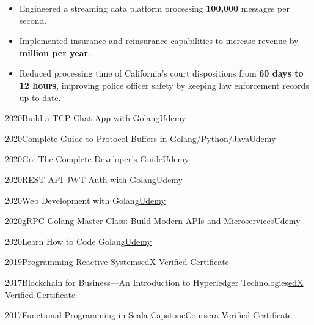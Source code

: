 \documentclass[a4paper,12pt]{article}
\newcommand{\head}[1]{\needspace{6em}\begin{center}{\large{\textbf{\sc{#1}}}}\nopagebreak\end{center}}
\newcommand{\tab}{\hspace{2em}}
\newcommand{\education}[3]{#1\tab#2\hfill#3}
\begin{document}
\head{Achievements}

\begin{itemize}

\item Engineered a streaming data platform processing \textbf{100,000} messages per second.

\item Implemented insurance and reinsurance capabilities to increase revenue by \textbf{ million per year}.

\item Reduced processing time of California's court dispositions from \textbf{60 days to 12 hours}, improving police officer safety by keeping law enforcement records up to date.

\end{itemize}

\head{Certifications}

\education{2020}{Build a TCP Chat App with Golang}{\href{https://www.udemy.com/certificate/UC-INP6UTFA}{Udemy}}

\education{2020}{Complete Guide to Protocol Buffers in Golang/Python/Java}{\href{https://www.udemy.com/certificate/UC-Q1168M4T}{Udemy}}

\education{2020}{Go: The Complete Developer's Guide}{\href{https://www.udemy.com/certificate/UC-2DGJ1LMN}{Udemy}}

\education{2020}{REST API JWT Auth with Golang}{\href{https://www.udemy.com/certificate/UC-D0WJ5R27}{Udemy}}

\education{2020}{Web Development with Golang}{\href{https://www.udemy.com/certificate/UC-1LJCOPO9}{Udemy}}

\education{2020}{gRPC Golang Master Class: Build Modern APIs and Microservices}{\href{https://www.udemy.com/certificate/UC-6F7LN2C4}{Udemy}}

\education{2020}{Learn How to Code Golang}{\href{https://www.udemy.com/certificate/UC-WX2AIINH/}{Udemy}}

\education{2019}{Programming Reactive Systems}{\href{https://courses.edx.org/certificates/3e7d7309b6d4469784d60ccccbe4562f}{edX Verified Certificate}}

\education{2017}{Blockchain for Business---An Introduction to Hyperledger Technologies}{\href{https://courses.edx.org/certificates/de3424d0c11842f48fb2c79ddf1073c8}{edX Verified Certificate}}

\education{2017}{Functional Programming in Scala Capstone}{\href{https://www.coursera.org/account/accomplishments/verify/4F5MVWUN8MWZ}{Coursera Verified Certificate}}
\end{document}
